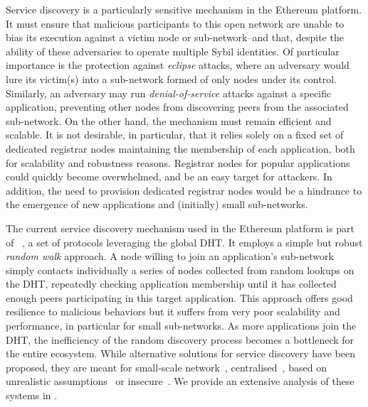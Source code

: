 Service discovery is a particularly sensitive mechanism in the Ethereum platform.
It must ensure that malicious participants to this open network are unable to bias its execution against a victim node or sub-network--and that, despite the ability of these adversaries to operate multiple Sybil identities.
Of particular importance is the protection against \emph{eclipse} attacks, where an adversary would lure its victim(s) into a sub-network formed of only nodes under its control.
Similarly, an adversary may run \emph{denial-of-service} attacks against a specific application, preventing other nodes from discovering peers from the associated sub-network.
On the other hand, the mechanism must remain efficient and scalable.
It is not desirable, in particular, that it relies solely on a fixed set of dedicated registrar nodes maintaining the membership of each application, both for scalability and robustness reasons. Registrar nodes for popular applications could quickly become overwhelmed, and be an easy target for attackers.
In addition, the need to provision dedicated registrar nodes would be a hindrance to the emergence of new applications and (initially) small sub-networks.

The current service discovery mechanism used in the Ethereum platform is part of \discv~\cite{discv4}, a set of protocols leveraging the global DHT.
It employs a simple but robust \emph{random walk} approach.
A node willing to join an application's sub-network simply contacts individually a series of nodes collected from random lookups on the DHT, repeatedly checking application membership until it has collected enough peers participating in this target application.
This approach offers good resilience to malicious behaviors but it suffers from very poor scalability and performance, in particular for small sub-networks. 
As more applications join the DHT, the inefficiency of the random discovery process becomes a bottleneck for the entire ecosystem. While alternative solutions for service discovery have been proposed, they are meant for small-scale network~\cite{zhang2002aggregate, helal2002standards}, centralised~\cite{RFC6763}, based on unrealistic assumptions~\cite{danezis2005sybil, danezis2009sybilinfer} or insecure~\cite{baldoni2007tera,scribe,poldercast,banno2015,scribe}. We provide an extensive analysis of these systems in .


